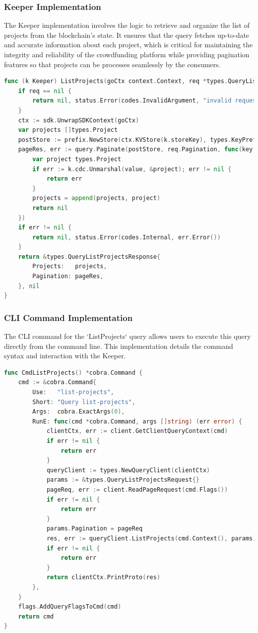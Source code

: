\subsubsection{Keeper Implementation}

The Keeper implementation involves the logic to retrieve and organize the list of projects from the blockchain's state. It ensures that the query fetches up-to-date and accurate information about each project, which is critical for maintaining the integrity and reliability of the crowdfunding platform while providing pagination features so that projects can be processes seamlessly by the consumers.

\begin{lstlisting}[language=go, caption={Keeper Implementation for List Projects Query}]
func (k Keeper) ListProjects(goCtx context.Context, req *types.QueryListProjectsRequest) (*types.QueryListProjectsResponse, error) {
	if req == nil {
		return nil, status.Error(codes.InvalidArgument, "invalid request")
	}
	ctx := sdk.UnwrapSDKContext(goCtx)
	var projects []types.Project
	postStore := prefix.NewStore(ctx.KVStore(k.storeKey), types.KeyPrefix(types.ProjectKey))
	pageRes, err := query.Paginate(postStore, req.Pagination, func(key []byte, value []byte) error {
		var project types.Project
		if err := k.cdc.Unmarshal(value, &project); err != nil {
			return err
		}
		projects = append(projects, project)
		return nil
	})
	if err != nil {
		return nil, status.Error(codes.Internal, err.Error())
	}
	return &types.QueryListProjectsResponse{
		Projects:   projects,
		Pagination: pageRes,
	}, nil
}
\end{lstlisting}

\subsubsection{CLI Command Implementation}

The CLI command for the `ListProjects` query allows users to execute this query directly from the command line. This implementation details the command syntax and interaction with the Keeper.


\begin{lstlisting}[language=go, caption={CLI Command Implementation for List Projects Query}]
func CmdListProjects() *cobra.Command {
	cmd := &cobra.Command{
		Use:   "list-projects",
		Short: "Query list-projects",
		Args:  cobra.ExactArgs(0),
		RunE: func(cmd *cobra.Command, args []string) (err error) {
			clientCtx, err := client.GetClientQueryContext(cmd)
			if err != nil {
				return err
			}
			queryClient := types.NewQueryClient(clientCtx)
			params := &types.QueryListProjectsRequest{}
			pageReq, err := client.ReadPageRequest(cmd.Flags())
			if err != nil {
				return err
			}
			params.Pagination = pageReq
			res, err := queryClient.ListProjects(cmd.Context(), params)
			if err != nil {
				return err
			}
			return clientCtx.PrintProto(res)
		},
	}
	flags.AddQueryFlagsToCmd(cmd)
	return cmd
}
\end{lstlisting}

